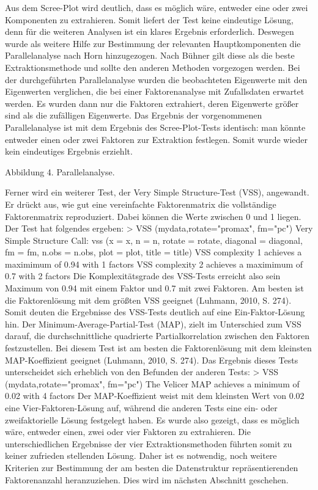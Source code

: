 \documentclass[12pt,a4paper]{article}
\begin{document}
									
Aus dem Scree-Plot wird deutlich, dass es möglich wäre, entweder eine oder zwei Komponenten zu extrahieren. Somit liefert der Test keine eindeutige Lösung, denn für die weiteren Analysen ist ein klares Ergebnis erforderlich.
	Deswegen wurde als weitere Hilfe zur Bestimmung der relevanten Hauptkomponenten die Parallelanalyse nach Horn hinzugezogen. Nach Bühner gilt diese als die beste Extraktionsmethode und sollte den anderen Methoden vorgezogen werden. Bei der durchgeführten Parallelanalyse wurden die beobachteten Eigenwerte mit den Eigenwerten verglichen, die bei einer Faktorenanalyse mit Zufallsdaten erwartet werden. Es wurden dann nur die Faktoren extrahiert, deren Eigenwerte größer sind als die zufälligen Eigenwerte. Das Ergebnis der vorgenommenen Parallelanalyse ist mit dem Ergebnis des Scree-Plot-Tests identisch: man könnte entweder einen oder zwei Faktoren zur Extraktion festlegen. Somit wurde wieder kein eindeutiges Ergebnis erziehlt.

Abbildung 4. Parallelanalyse.

Ferner wird ein weiterer Test, der Very Simple Structure-Test (VSS), angewandt. Er drückt aus, wie gut eine vereinfachte Faktorenmatrix die vollständige Faktorenmatrix reproduziert. Dabei können die Werte zwischen 0 und 1 liegen. Der Test hat folgendes ergeben: 
	> VSS (mydata,rotate="promax", fm="pc")
	Very Simple Structure
	Call: vss (x = x, n = n, rotate = rotate, diagonal = 	diagonal, fm = fm, n.obs = n.obs, plot = plot, title = 	title)
	VSS complexity 1 achieves a maximimum of 0.94 with 1  	factors
	VSS complexity 2 achieves a maximimum of 0.7 with  2  	factors
Die Komplexitätsgrade des VSS-Tests erreicht also sein Maximum von 0.94 mit einem Faktor und 0.7 mit zwei Faktoren. Am besten ist die Faktorenlösung mit dem größten VSS geeignet (Luhmann, 2010, S. 274). Somit deuten die Ergebnisse des VSS-Tests deutlich auf eine Ein-Faktor-Lösung hin.
	Der Minimum-Average-Partial-Test (MAP), zielt im Unterschied zum VSS darauf, die durchschnittliche quadrierte Partialkorrelation zwischen den Faktoren festzustellen.  Bei diesem Test ist am besten die Faktorenlösung mit dem kleinsten MAP-Koeffizient geeignet (Luhmann, 2010, S. 274). Das Ergebnis dieses Tests unterscheidet sich erheblich von den Befunden der anderen Tests:
	> VSS (mydata,rotate="promax", fm="pc")
	The Velicer MAP achieves a minimum of 0.02 with 4 factors 
Der MAP-Koeffizient weist mit dem kleinsten Wert von 0.02 eine Vier-Faktoren-Lösung auf, während die anderen Tests eine ein- oder zweifaktorielle Lösung festgelegt haben.
	Es wurde also gezeigt, dass es möglich wäre, entweder einen, zwei oder vier Faktoren zu extrahieren. Die unterschiedlichen Ergebnisse der vier Extraktionsmethoden führten somit zu keiner zufrieden stellenden Lösung. Daher  ist es notwendig, noch weitere Kriterien zur Bestimmung der am besten die Datenstruktur repräsentierenden Faktorenanzahl heranzuziehen. Dies wird im nächsten Abschnitt geschehen.
\end{document}
